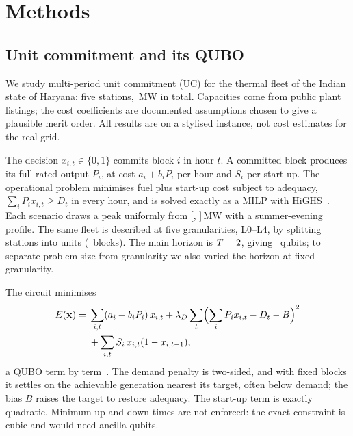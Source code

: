 \section{Methods}
\label{sec:methods}

\subsection{Unit commitment and its QUBO}
\label{sec:problem}

We study multi-period unit commitment (UC) for the thermal fleet of the Indian state of Haryana: five stations, \FleetCap\,MW in total. Capacities come from public plant listings; the cost coefficients are documented assumptions chosen to give a plausible merit order. All results are on a stylised instance, not cost estimates for the real grid.

The decision $x_{i,t}\in\{0,1\}$ commits block $i$ in hour $t$. A committed block produces its full rated output $P_i$, at cost $a_i+b_iP_i$ per hour and $S_i$ per start-up. The operational problem minimises fuel plus start-up cost subject to adequacy, $\sum_iP_ix_{i,t}\geq D_t$ in every hour, and is solved exactly as a MILP with HiGHS~\cite{huangfu2018highs}. Each scenario draws a peak uniformly from [\LoadMin, \LoadMax]\,MW with a summer-evening profile. The same fleet is described at five granularities, L0--L4, by splitting stations into units (\LadderBlocks\ blocks). The main horizon is $T=2$, giving \LadderQubits\ qubits; to separate problem size from granularity we also varied the horizon at fixed granularity.

\label{sec:qubo}
The circuit minimises
\begin{equation}
\begin{split}
E(\mathbf x) ={}& \sum_{i,t}(a_i+b_iP_i)\,x_{i,t}
 + \lambda_D\sum_t\Bigl(\sum_i P_i x_{i,t} - D_t - B\Bigr)^2\\
 &+ \sum_{i,t} S_i\,x_{i,t}(1-x_{i,t-1}),
\end{split}
\label{eq:qubo}
\end{equation}
a QUBO term by term~\cite{lucas2014ising}. The demand penalty is two-sided, and with fixed blocks it settles on the achievable generation nearest its target, often below demand; the bias $B$ raises the target to restore adequacy. The start-up term is exactly quadratic. Minimum up and down times are not enforced: the exact constraint is cubic and would need ancilla qubits.

